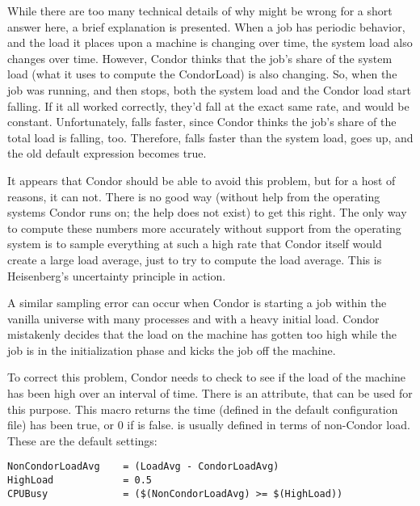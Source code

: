 While there are too many technical details of why
 might be wrong for a short answer here, a brief
explanation is presented.
When a job has periodic behavior, and the load it places upon
a machine is changing over time,
the system load also changes over time.  
However, Condor thinks that the job's share of the system load
(what it uses to compute the CondorLoad) is also changing.
So, when the job was running, and then stops, both the system load and
the Condor load start falling.
If it all worked correctly, they'd fall at the exact same rate, and
 would be constant.
Unfortunately,  falls faster, since Condor
thinks the job's share of the total load is falling, too.
Therefore,  falls faster than the system load,
 goes up, and the old default 
expression becomes true.

It appears that Condor should be able to avoid this problem, but for a
host of reasons, it can not.  
There is no good way (without help from the operating systems Condor runs on;
the help does not exist) to get this right.
The only way to compute these numbers more accurately
without support from the operating system is to sample everything at
such a high rate that Condor itself would create a large load average,
just to try to compute the load average.
This is Heisenberg's uncertainty principle in action.

A similar sampling error can occur when Condor is starting a job
within the vanilla universe with many processes and with a
heavy initial load.
Condor mistakenly decides that the load on the machine has gotten too
high while the job is in the initialization phase and kicks the job off
the machine.

To correct this problem, Condor needs to check to see if the load of the
machine has been high over an interval of time.
There is an attribute,  that can be used for
this purpose.
This macro returns the time  (defined in the default
configuration file) has been true, or 0 if  is false.
 is usually defined in terms of non-Condor load.
These are the default settings:

\begin{verbatim}
NonCondorLoadAvg    = (LoadAvg - CondorLoadAvg)
HighLoad            = 0.5
CPUBusy             = ($(NonCondorLoadAvg) >= $(HighLoad))
\end{verbatim}

